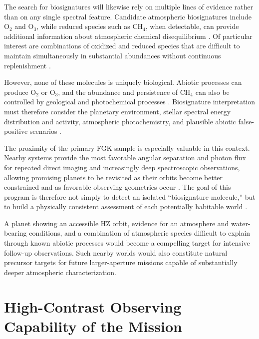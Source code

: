 The search for biosignatures will likewise rely on multiple lines of evidence
rather than on any single spectral feature. Candidate atmospheric biosignatures
include O$_2$ and O$_3$, while reduced species such as CH$_4$, when detectable,
can provide additional information about atmospheric chemical disequilibrium
\cite{Schwieterman2018,Meadows2018,KrissansenTotton2018}. Of particular interest
are combinations of oxidized and reduced species that are difficult to maintain
simultaneously in substantial abundances without continuous replenishment
\cite{KrissansenTotton2018}.

However, none of these molecules is uniquely biological. Abiotic processes can
produce O$_2$ or O$_3$, and the abundance and persistence of CH$_4$ can also be
controlled by geological and photochemical processes
\cite{Meadows2018,Schwieterman2018}. Biosignature interpretation must therefore
consider the planetary environment, stellar spectral energy distribution and
activity, atmospheric photochemistry, and plausible abiotic false-positive
scenarios \cite{Catling2018,Meadows2018}.

The proximity of the primary FGK sample is especially valuable in this context.
Nearby systems provide the most favorable angular separation and photon flux for
repeated direct imaging and increasingly deep spectroscopic observations, allowing
promising planets to be revisited as their orbits become better constrained and
as favorable observing geometries occur \cite{Tuchow2024}. The goal of this
program is therefore not simply to detect an isolated ``biosignature molecule,''
but to build a physically consistent assessment of each potentially habitable
world \cite{Catling2018}.

A planet showing an accessible HZ orbit, evidence for an atmosphere and
water-bearing conditions, and a combination of atmospheric species difficult
to explain through known abiotic processes would become a compelling target for
intensive follow-up observations. Such nearby worlds would also constitute
natural precursor targets for future larger-aperture missions capable of
substantially deeper atmospheric characterization.

\vspace*{1.0cm}

\section{High-Contrast Observing Capability of the Mission}
\label{sec:context}

